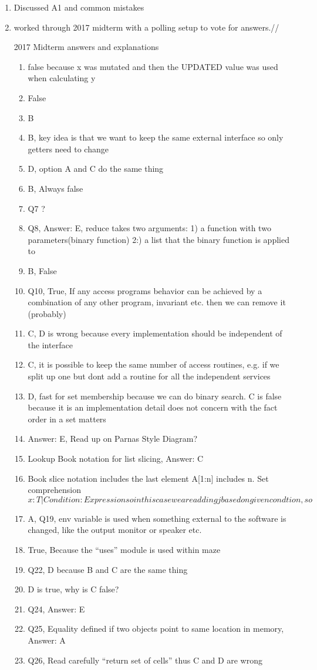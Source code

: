 \documentclass[12pt]{article}
\begin{document}
\begin{enumerate}
\item Discussed A1 and common mistakes
\item worked through 2017 midterm with a polling setup to vote for answers.//

2017 Midterm answers and explanations

	\begin{enumerate}
	\item false because x was mutated and then the UPDATED value was used when calculating y
	\item False
	\item B
	\item B, key idea is that we want to keep the same external interface so only getters need to change
	\item D, option A and C do the same thing
	\item B, Always false
	\item Q7 ?
	\item Q8, Answer: E, reduce takes two arguments: 1) a function with two parameters(binary function) 2:) a list that the binary function is applied to
	\item B, False
	\item Q10, True, If any access programs behavior can be achieved by a combination of any other program, invariant etc. then we can remove it (probably)
	\item C, D is  wrong because every implementation should be independent of the interface
	\item C, it is possible to keep the same number of access routines, e.g. if we split up one but dont add a routine for all the independent services
	\item D, fast for set membership because we can do binary search. C is false because it is an implementation detail does not concern with the fact order in a set matters
	\item Answer: E, Read up on Parnas Style Diagram?
	\item Lookup Book notation for list slicing, Answer: C
	\item Book slice notation includes the last element A[1:n] includes n. Set comprehension ${x: T | Condition: Expression} so in this case we are adding j based on given condtion, so $
	\item A, Q19, env variable is used when something external to the software is changed, like the output monitor or speaker etc.
	\item True, Because the ``uses'' module is used within maze
	\item Q22, D because B and C are the same thing
	\item D is true, why is C false?
	\item Q24, Answer: E
	\item Q25, Equality defined if two objects point to same location in memory, Answer: A
	\item Q26, Read carefully ``return set of cells'' thus C and D are wrong
	
	\end{enumerate}
\end{enumerate}
\end{document}
